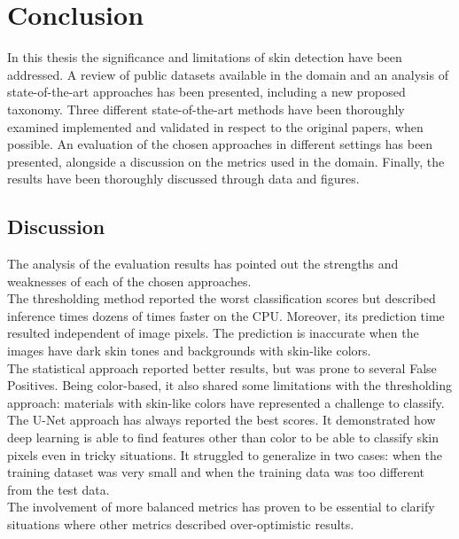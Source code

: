 \chapter{Conclusion}\label{chap:conclusion}


In this thesis the significance and limitations of skin detection have been addressed.
A review of public datasets available in the domain and an analysis of state-of-the-art approaches has been presented, including a new proposed taxonomy.
Three different state-of-the-art methods have been thoroughly examined implemented and validated in respect to the original papers, when possible.
An evaluation of the chosen approaches in different settings has been presented, alongside a discussion on the metrics used in the domain.
Finally, the results have been thoroughly discussed through data and figures.


\section{Discussion}

The analysis of the evaluation results has pointed out the strengths and weaknesses of each of the chosen approaches.\\
The thresholding method reported the worst classification scores but described inference times dozens of times faster on the CPU.
Moreover, its prediction time resulted independent of image pixels.
The prediction is inaccurate when the images have dark skin tones and backgrounds with skin-like colors.\\
The statistical approach reported better results, but was prone to several False Positives.
Being color-based, it also shared some limitations with the thresholding approach: materials with skin-like colors have represented a challenge to classify.\\
The U-Net approach has always reported the best scores.
It demonstrated how deep learning is able to find features other than color to be able to classify skin pixels even in tricky situations.
It struggled to generalize in two cases: when the training dataset was very small and when the training data was too different from the test data.\\
The involvement of more balanced metrics has proven to be essential to clarify situations where other metrics described over-optimistic results.


